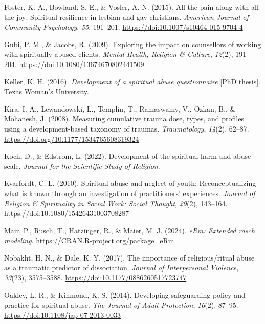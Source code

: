 \documentclass[
  letterpaper,
]{article}
\newlength{\cslhangindent}
\newenvironment{CSLReferences}[2] %
 {\begin{list}{}{%
  \setlength{\itemindent}{0pt}
  \setlength{\leftmargin}{0pt}
  \setlength{\parsep}{0pt}
  \ifodd #1
   \setlength{\leftmargin}{\cslhangindent}
   \setlength{\itemindent}{-1\cslhangindent}
  \fi
  \setlength{\itemsep}{#2\baselineskip}}}
 {\end{list}}
\begin{document}
\begin{CSLReferences}{1}{0}
Foster, K. A., Bowland, S. E., \& Vosler, A. N. (2015). All the pain
along with all the joy: Spiritual resilience in lesbian and gay
christians. \emph{American Journal of Community Psychology}, \emph{55},
191--201. \url{https://doi:10.1007/s10464-015-9704-4}

Gubi, P. M., \& Jacobs, R. (2009). Exploring the impact on counsellors
of working with spiritually abused clients. \emph{Mental Health,
Religion \& Culture}, \emph{12}(2), 191--204.
\url{https://doi:10.1080/13674670802441509}

Keller, K. H. (2016). \emph{Development of a spiritual abuse
questionnaire} {[}PhD thesis{]}. Texas Woman's University.

Kira, I. A., Lewandowski, L., Templin, T., Ramaswamy, V., Ozkan, B., \&
Mohanesh, J. (2008). Measuring cumulative trauma dose, types, and
profiles using a development-based taxonomy of traumas.
\emph{Traumatology}, \emph{14}(2), 62--87.
\url{https://doi.org/10.1177/1534765608319324}

Koch, D., \& Edstrom, L. (2022). Development of the spiritual harm and
abuse scale. \emph{Journal for the Scientific Study of Religion}.

Kvarfordt, C. L. (2010). Spiritual abuse and neglect of youth:
Reconceptualizing what is known through an investigation of
practitioners' experiences. \emph{Journal of Religion \& Spirituality in
Social Work: Social Thought}, \emph{29}(2), 143--164.
\url{https://doi:10.1080/15426431003708287}

Mair, P., Rusch, T., Hatzinger, R., \& Maier, M. J. (2024). \emph{eRm:
Extended rasch modeling}. \url{https://CRAN.R-project.org/package=eRm}

Nobakht, H. N., \& Dale, K. Y. (2017). The importance of
religious/ritual abuse as a traumatic predictor of dissociation.
\emph{Journal of Interpersonal Violence}, \emph{33}(23), 3575--3588.
\url{https://doi:10.1177/0886260517723747}

Oakley, L. R., \& Kinmond, K. S. (2014). Developing safeguarding policy
and practice for spiritual abuse. \emph{The Journal of Adult
Protection}, \emph{16}(2), 87--95.
\url{https://doi:10.1108/jap-07-2013-0033}


\end{CSLReferences}
\end{document}
